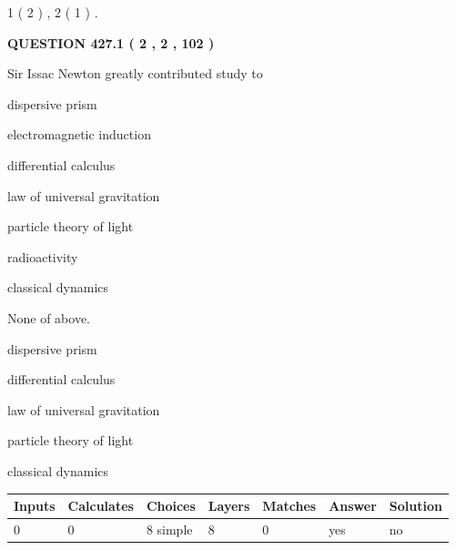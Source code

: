 \documentclass[12pt]{article}
\begin{document}
   
   1 ( 2 )
 ,
   2 ( 1 )
 .
  
\vspace{0.2in}
  
{\textbf{\Large{QUESTION
427.1 
 ( 2 , 2 , 102 )
}}}
  
  
Sir Issac Newton greatly contributed study to
 
 
dispersive prism
 
 
electromagnetic induction
 
 
differential calculus
 
 
law of universal gravitation
 
 
particle theory of light
 
 
radioactivity
 
 
classical dynamics
 
 
 None of above.
 
 
\noindent{}
 
 
dispersive prism
 
 
differential calculus
 
 
law of universal gravitation
 
 
particle theory of light
 
 
classical dynamics
 
 
\noindent{}
 
 
   
   
   
   
\noindent\begin{tabular}{|l|l|l|l|l|l|l|}
 \hline
Inputs & Calculates & Choices & Layers & Matches & Answer & Solution \\ \hline
 0  & 
 0  & 
 8
  simple  
  & 
 8  & 
 0  & 
  yes & 
  no 
  \\ \hline
 \end{tabular}
   
   
   
   
\noindent{}
   
\end{document}
